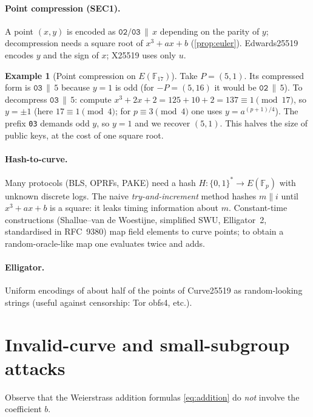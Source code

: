 \documentclass[11pt,a4paper,oneside]{book}
\theoremstyle{plain}
\theoremstyle{definition}
\newtheorem{example}[theorem]{Example}
\theoremstyle{remark}
\newcommand{\F}{\mathbb{F}}
\newcommand{\Fp}{\mathbb{F}_p}
\begin{document}
\paragraph{Point compression (SEC1).} A point $(x,y)$ is encoded as $\texttt{02}/\texttt{03}\,\|\,x$ depending on the parity of $y$; decompression needs a square root of $x^3+ax+b$ (\cref{prop:euler}). Edwards25519 encodes $y$ and the sign of $x$; X25519 uses only $u$.

\begin{example}[Point compression on $E(\F_{17})$]
Take $P=(5,1)$. Its compressed form is $\texttt{03}\,\|\,5$ because $y=1$ is odd (for $-P=(5,16)$ it would be $\texttt{02}\,\|\,5$). To decompress $\texttt{03}\,\|\,5$: compute $x^3+2x+2=125+10+2=137\equiv1\pmod{17}$, so $y=\pm1$ (here $17\equiv1\pmod4$; for $p\equiv3\pmod4$ one uses $y=a^{(p+1)/4}$). The prefix \texttt{03} demands odd $y$, so $y=1$ and we recover $(5,1)$. This halves the size of public keys, at the cost of one square root.
\end{example}

\paragraph{Hash-to-curve.} Many protocols (BLS, OPRFs, PAKE) need a hash $H:\{0,1\}^*\to E(\Fp)$ with unknown discrete logs. The naive \emph{try-and-increment} method hashes $m\|i$ until $x^3+ax+b$ is a square: it leaks timing information about $m$. Constant-time constructions (Shallue--van de Woestijne, simplified SWU, Elligator~2, standardised in RFC~9380) map field elements to curve points; to obtain a random-oracle-like map one evaluates twice and adds.

\paragraph{Elligator.} Uniform encodings of about half of the points of Curve25519 as random-looking strings (useful against censorship: Tor obfs4, etc.).

\section{Invalid-curve and small-subgroup attacks}\label{sec:invalid-curve}

Observe that the Weierstrass addition formulas \eqref{eq:addition} do \emph{not} involve the coefficient $b$.
\end{document}
